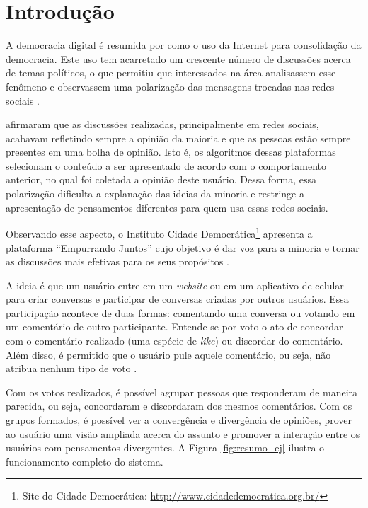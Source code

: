 \chapter[Introdução]{Introdução} \label{cap:introducao}

A democracia digital é resumida por  como o uso da Internet para consolidação da democracia.
Este uso tem acarretado um crescente número de discussões acerca de temas políticos, 
o que permitiu que interessados na área analisassem esse fenômeno e observassem uma 
polarização das mensagens trocadas nas redes sociais \cite{empurrandojuntos}.

 afirmaram que as discussões realizadas, principalmente em redes sociais, 
acabavam refletindo sempre a opinião da maioria e que as pessoas estão sempre presentes em uma bolha de opinião. 
Isto é, os algoritmos dessas plataformas selecionam o conteúdo a ser apresentado de acordo com o comportamento anterior,
no qual foi coletada a opinião deste usuário.
Dessa forma, essa polarização dificulta a explanação das ideias da minoria e restringe a apresentação de 
pensamentos diferentes para quem usa essas redes sociais. 

Observando esse aspecto, o Instituto Cidade Democrática\footnote{Site do Cidade Democrática: \url{http://www.cidadedemocratica.org.br/}} 
apresenta a plataforma ``Empurrando Juntos'' cujo objetivo 
é dar voz para a minoria e tornar as discussões mais efetivas para os seus propósitos \cite{empurrandojuntos}.

A ideia é que um usuário entre em um \textit{website} ou em um aplicativo de celular para criar conversas e 
participar de conversas criadas por outros usuários. Essa participação 
acontece de duas formas: comentando uma conversa ou votando em um comentário de outro participante. Entende-se por voto
o ato de concordar com o comentário realizado (uma espécie de \textit{like}) ou discordar do comentário. Além disso, é permitido
que o usuário pule aquele comentário, ou seja, não atribua nenhum tipo de voto \cite{empurrandojuntos}. 

Com os votos realizados, é possível agrupar pessoas que responderam de maneira parecida, ou seja, concordaram e
discordaram dos mesmos comentários. Com os grupos formados, é possível ver a convergência e divergência de opiniões, 
prover ao usuário uma visão ampliada acerca do assunto e promover a interação entre os usuários com 
pensamentos divergentes. A Figura \ref{fig:resumo_ej} ilustra o funcionamento completo do sistema.


